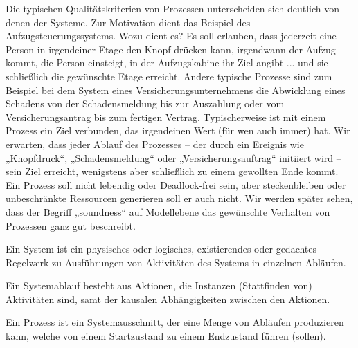 \vspace{1mm} %

Die typischen Qualitätskriterien von Prozessen 
unterscheiden sich deutlich von denen der Systeme. Zur Motivation dient das Beispiel des Aufzugsteuerungssystems. Wozu dient es? Es soll erlauben, dass jederzeit eine Person in irgendeiner Etage den Knopf drücken kann, irgendwann der Aufzug kommt, die Person einsteigt, in der Aufzugskabine ihr Ziel angibt ... und sie schließlich die gewünschte Etage erreicht. Andere typische Prozesse sind zum Beispiel bei dem System eines Versicherungsunternehmens die Abwicklung eines Schadens von der Schadensmeldung bis zur Auszahlung oder vom Versicherungsantrag bis zum fertigen Vertrag. Typischerweise ist mit einem Prozess ein Ziel verbunden, das irgendeinen Wert (für wen auch immer) hat. Wir erwarten, dass jeder Ablauf des Prozesses -- der durch ein Ereignis wie „Knopfdruck“, „Schadensmeldung“ oder „Versicherungsauftrag“ initiiert wird -- sein Ziel erreicht, wenigstens aber schließlich zu einem gewollten Ende kommt. Ein Prozess soll nicht lebendig oder Deadlock-frei sein, aber steckenbleiben oder unbeschränkte Ressourcen generieren soll er auch nicht. Wir werden später sehen, dass der Begriff „soundness“ auf Modellebene das gewünschte Verhalten von Prozessen ganz gut beschreibt.


{Ein System ist ein physisches oder logisches, existierendes oder gedachtes Regelwerk zu Ausführungen von Aktivitäten des Systems in einzelnen Abläufen.}

\vspace{-\baselineskip} %
\vspace{-2mm} %

{Ein Systemablauf besteht aus Aktionen, die Instanzen (Stattfinden von) Aktivitäten sind, samt der kausalen Abhängigkeiten zwischen den Aktionen.}

\vspace{-\baselineskip} %
\vspace{-2mm} %

{Ein Prozess ist ein Systemausschnitt, der eine Menge von Abläufen produzieren kann, welche von einem Startzustand zu einem Endzustand führen (sollen).}

